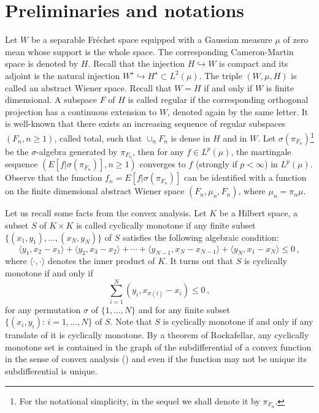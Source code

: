 \documentclass[12pt,a4paper]{book}
\begin{document}
\section{Preliminaries and notations}
\label{preliminaries}
Let $W$ be a separable Fr\'echet space equipped with  a Gaussian
measure $\mu$ of zero mean whose support is the whole space. The
corresponding Cameron-Martin space is denoted by $H$. Recall that the
injection $H\hookrightarrow W$ is compact and its adjoint is the
natural injection $W^\star\hookrightarrow H^\star\subset
L^2(\mu)$. The triple $(W,\mu,H)$ is called 
an abstract Wiener space. Recall that $W=H$ if and only if $W$ is
finite dimensional. A subspace $F$ of $H$ is called regular if the
corresponding orthogonal projection 
has a continuous extension to $W$, denoted again  by the same letter.
It is well-known that there exists an increasing sequence of regular
subspaces $(F_n,n\geq 1)$, called total,  such that $\cup_nF_n$ is
dense in $H$ and in $W$. Let $\sigma(\pi_{F_n})${\footnote{For the notational
  simplicity, in the sequel we shall denote  it by  $\pi_{F_n}$.}}  be the
$\sigma$-algebra generated by $\pi_{F_n}$, then  for any  $f\in
L^p(\mu)$, the martingale  sequence 
$(E[f|\sigma(\pi_{F_n})],n\geq 1)$
converges to $f$ (strongly if 
$p<\infty$) in $L^p(\mu)$. Observe that the function
$f_n=E[f|\sigma(\pi_{F_n})]$ can be identified with a function on the
finite dimensional abstract Wiener space $(F_n,\mu_n,F_n)$, where
$\mu_n=\pi_n\mu$. 


Let us recall some facts from the convex analysis. Let $K$ be a 
Hilbert space, a subset $S$ of $K\times K$ is called cyclically
monotone if  any finite subset 
$\{(x_1,y_1),\ldots,(x_N,y_N)\}$ of
$S$ satisfies the following algebraic condition:
$$
\langle y_1,x_2-x_1\rangle+\langle y_2,x_3-x_2\rangle+\cdots+\langle
y_{N-1},x_N-x_{N-1}\rangle+\langle y_N,x_1-x_N\rangle\leq 0\,,
$$
where $\langle\cdot,\cdot\rangle$ denotes the inner product of
$K$. It turns out  that $S$ is
cyclically monotone if and only if 
$$
\sum_{i=1}^N(y_i,x_{\sigma(i)}-x_i)\leq 0\,,
$$
for any permutation $\sigma$ of $\{1,\ldots,N\}$ and for any finite
subset $\{(x_i,y_i):\,i=1,\ldots,N\}$ of $S$.
Note that  $S$ is
cyclically monotone if and only if any translate of it is cyclically
monotone.  By a theorem of Rockafellar,  any cyclically monotone set is
contained in the graph of the subdifferential  of a convex function in the
sense of convex analysis (\cite{ROC}) and even if the function may not
be unique its subdifferential  is unique. 
\end{document}
